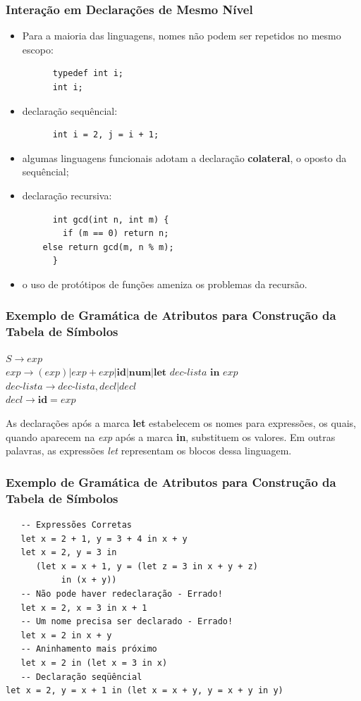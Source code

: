 \documentclass[table]{beamer}
\begin{document}
\begin{frame}[fragile]
   \frametitle{Interação em Declarações de Mesmo Nível}
   \begin{itemize}
      \item Para a maioria das linguagens, nomes não podem ser repetidos no mesmo escopo:
      \begin{verbatim}
      typedef int i;
      int i;
      \end{verbatim}
      \item declaração sequêncial:
      \begin{verbatim}
      int i = 2, j = i + 1;
      \end{verbatim}
      \item algumas linguagens funcionais adotam a declaração \textbf{colateral}, o oposto da sequêncial;
      \item declaração recursiva:
      \begin{verbatim}
      int gcd(int n, int m) {
        if (m == 0) return n;
	else return gcd(m, n % m);
      }	
      \end{verbatim}
      \item o uso de protótipos de funções ameniza os problemas da recursão.
   \end{itemize}
\end{frame}

\begin{frame}
   \frametitle{Exemplo de Gramática de Atributos para Construção da Tabela de Símbolos}
   $S\to exp$ \\
   $exp\to(exp)|exp + exp|\textbf{id}|\textbf{num}|\textbf{let } \textit{dec-lista} \textbf{ in } exp$ \\
   $\textit{dec-lista} \to \textit{dec-lista}, decl | decl$ \\
   $decl\to \textbf{id}=exp$ \\
   \vspace{1.0cm}
   
   As declarações após a marca \textbf{let} estabelecem os nomes para expressões, os quais, quando aparecem na \textit{exp} após a marca \textbf{in}, substituem os valores. Em outras palavras, as expressões \textit{let} representam os blocos dessa linguagem.
\end{frame}

\begin{frame}[fragile]
   \frametitle{Exemplo de Gramática de Atributos para Construção da Tabela de Símbolos}
   \begin{verbatim}
   -- Expressões Corretas
   let x = 2 + 1, y = 3 + 4 in x + y
   let x = 2, y = 3 in
      (let x = x + 1, y = (let z = 3 in x + y + z)
           in (x + y))
   -- Não pode haver redeclaração - Errado!
   let x = 2, x = 3 in x + 1
   -- Um nome precisa ser declarado - Errado!
   let x = 2 in x + y
   -- Aninhamento mais próximo
   let x = 2 in (let x = 3 in x)
   -- Declaração seqüêncial
let x = 2, y = x + 1 in (let x = x + y, y = x + y in y)
   \end{verbatim}
\end{frame}
\end{document}
